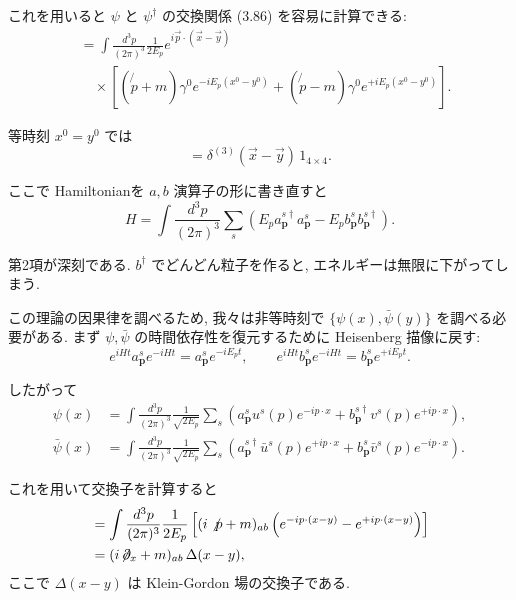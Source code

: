 \documentclass[a4paper,12pt]{article}
\begin{document}
これを用いると $\psi$ と $\psi^\dagger$ の交換関係 (3.86) を容易に計算できる:
\begin{align}
[\psi(x), \psi^\dagger(y)] &= \int \frac{d^3p}{(2\pi)^3}\frac{1}{2E_p} e^{i\vec{p}\cdot(\vec{x}-\vec{y})} \\
&\quad \times \left[ (\not{p}+m)\gamma^0 e^{-iE_p(x^0-y^0)} 
+ (\not{p}-m)\gamma^0 e^{+iE_p(x^0-y^0)} \right].
\end{align}

等時刻 $x^0=y^0$ では
\begin{equation}
[\psi(x), \psi^\dagger(y)] = \delta^{(3)}(\vec{x}-\vec{y}) \, 1_{4\times4}.
\tag{3.89}
\end{equation}

ここで Hamiltonianを $a,b$ 演算子の形に書き直すと
\begin{equation}
H = \int \frac{d^3p}{(2\pi)^3} \sum_s \left( E_p a^{s\dagger}_{\mathbf{p}} a^s_{\mathbf{p}}
- E_p b^s_{\mathbf{p}} b^{s\dagger}_{\mathbf{p}} \right).
\tag{3.90}
\end{equation}

第2項が深刻である. $b^\dagger$ でどんどん粒子を作ると, エネルギーは無限に下がってしまう.  

この理論の因果律を調べるため, 我々は非等時刻で $\{\psi(x),\bar{\psi}(y)\}$ を調べる必要がある. まず $\psi,\bar{\psi}$ の時間依存性を復元するために Heisenberg 描像に戻す:
\begin{equation}
e^{iHt} a^s_{\mathbf{p}} e^{-iHt} = a^s_{\mathbf{p}} e^{-iE_pt}, 
\qquad e^{iHt} b^s_{\mathbf{p}} e^{-iHt} = b^s_{\mathbf{p}} e^{+iE_pt}.
\tag{3.91}
\end{equation}

したがって
\begin{align}
\psi(x) &= \int \frac{d^3p}{(2\pi)^3} \frac{1}{\sqrt{2E_p}} 
\sum_s \left( a^s_{\mathbf{p}} u^s(p)e^{-ip\cdot x} + b^{s\dagger}_{\mathbf{p}} v^s(p)e^{+ip\cdot x} \right), \\
\bar{\psi}(x) &= \int \frac{d^3p}{(2\pi)^3} \frac{1}{\sqrt{2E_p}} 
\sum_s \left( a^{s\dagger}_{\mathbf{p}} \bar{u}^s(p)e^{+ip\cdot x} + b^s_{\mathbf{p}} \bar{v}^s(p)e^{-ip\cdot x} \right).
\tag{3.92}
\end{align}

これを用いて交換子を計算すると
\begin{align}
[\psi_a(x), \bar{\psi}_b(y)] 
&= \int \frac{d^3p}{(2\pi)^3}\frac{1}{2E_p} \left[ (i\not{p}+m)_{ab} \left(e^{-ip\cdot(x-y)} - e^{+ip\cdot(x-y)}\right) \right] \\
&= (i\!\not\!\partial_x + m)_{ab} \, \Delta(x-y),
\end{align}
ここで $\Delta(x-y)$ は Klein-Gordon 場の交換子である.
\end{document}
